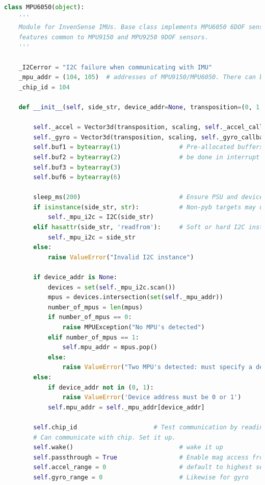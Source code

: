 \documentclass[conference]{IEEEtran}
\begin{document}
\begin{lstlisting}[language=Python, caption=IMU Code, label=imu_code]
class MPU6050(object):
    '''
    Module for InvenSense IMUs. Base class implements MPU6050 6DOF sensor, with
    features common to MPU9150 and MPU9250 9DOF sensors.
    '''

    _I2Cerror = "I2C failure when communicating with IMU"
    _mpu_addr = (104, 105)  # addresses of MPU9150/MPU6050. There can be two devices
    _chip_id = 104

    def __init__(self, side_str, device_addr=None, transposition=(0, 1, 2), scaling=(1, 1, 1)):

        self._accel = Vector3d(transposition, scaling, self._accel_callback)
        self._gyro = Vector3d(transposition, scaling, self._gyro_callback)
        self.buf1 = bytearray(1)                # Pre-allocated buffers for reads: allows reads to
        self.buf2 = bytearray(2)                # be done in interrupt handlers
        self.buf3 = bytearray(3)
        self.buf6 = bytearray(6)

        sleep_ms(200)                           # Ensure PSU and device have settled
        if isinstance(side_str, str):           # Non-pyb targets may use other than X or Y
            self._mpu_i2c = I2C(side_str)
        elif hasattr(side_str, 'readfrom'):     # Soft or hard I2C instance. See issue #3097
            self._mpu_i2c = side_str
        else:
            raise ValueError("Invalid I2C instance")

        if device_addr is None:
            devices = set(self._mpu_i2c.scan())
            mpus = devices.intersection(set(self._mpu_addr))
            number_of_mpus = len(mpus)
            if number_of_mpus == 0:
                raise MPUException("No MPU's detected")
            elif number_of_mpus == 1:
                self.mpu_addr = mpus.pop()
            else:
                raise ValueError("Two MPU's detected: must specify a device address")
        else:
            if device_addr not in (0, 1):
                raise ValueError('Device address must be 0 or 1')
            self.mpu_addr = self._mpu_addr[device_addr]

        self.chip_id                     # Test communication by reading chip_id: throws exception on error
        # Can communicate with chip. Set it up.
        self.wake()                             # wake it up
        self.passthrough = True                 # Enable mag access from main I2C bus
        self.accel_range = 0                    # default to highest sensitivity
        self.gyro_range = 0                     # Likewise for gyro


\end{lstlisting}
\end{document}
